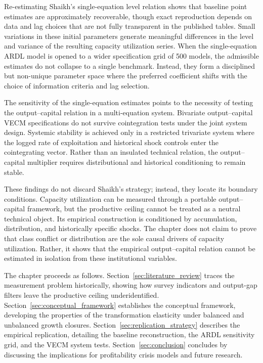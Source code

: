 \documentclass[11pt]{article}
\begin{document}
Re-estimating Shaikh's single-equation level relation shows that baseline point estimates are approximately recoverable, though exact reproduction depends on data and lag choices that are not fully transparent in the published tables. Small variations in these initial parameters generate meaningful differences in the level and variance of the resulting capacity utilization series. When the single-equation ARDL model is opened to a wider specification grid of 500 models, the admissible estimates do not collapse to a single benchmark. Instead, they form a disciplined but non-unique parameter space where the preferred coefficient shifts with the choice of information criteria and lag selection.

The sensitivity of the single-equation estimates points to the necessity of testing the output--capital relation in a multi-equation system. Bivariate output--capital VECM specifications do not survive cointegration tests under the joint system design. Systemic stability is achieved only in a restricted trivariate system where the logged rate of exploitation and historical shock controls enter the cointegrating vector. Rather than an insulated technical relation, the output--capital multiplier requires distributional and historical conditioning to remain stable.

These findings do not discard Shaikh’s strategy; instead, they locate its boundary conditions. Capacity utilization can be measured through a portable output--capital framework, but the productive ceiling cannot be treated as a neutral technical object. Its empirical construction is conditioned by accumulation, distribution, and historically specific shocks. The chapter does not claim to prove that class conflict or distribution are the sole causal drivers of capacity utilization. Rather, it shows that the empirical output--capital relation cannot be estimated in isolation from these institutional variables.

The chapter proceeds as follows. Section~\ref{sec:literature_review} traces the measurement problem historically, showing how survey indicators and output-gap filters leave the productive ceiling underidentified. Section~\ref{sec:conceptual_framework} establishes the conceptual framework, developing the properties of the transformation elasticity under balanced and unbalanced growth closures. Section~\ref{sec:replication_strategy} describes the empirical replication, detailing the baseline reconstruction, the ARDL sensitivity grid, and the VECM system tests. Section~\ref{sec:conclusion} concludes by discussing the implications for profitability crisis models and future research.
\end{document}
